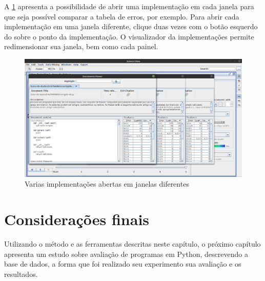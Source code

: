 		A \cref{fig:ladoAlado} apresenta a possibilidade de abrir uma implementação em
		cada janela para que seja possível comparar a tabela de erros, por exemplo.
		Para abrir cada implementação em uma janela diferente, clique duas vezes com
		o botão esquerdo do  sobre o ponto da implementação. O
		visualizador da implementações permite redimensionar sua janela, bem como
		cada painel.
		
		\begin{figure}
			\centering
			\includegraphics[width=0.7\linewidth]{imagem/ladoAlado}
			\caption{Varias implementações abertas em janelas diferentes}
			\label{fig:ladoAlado}
		\end{figure}
		

	\section{Considerações finais}
	
		Utilizando o método e as ferramentas descritas neste capítulo,
		o próximo capítulo apresenta um estudo sobre avaliação de programas em Python,
		descrevendo a base de dados, a forma que foi realizado
		seu experimento sua avaliação e os resultados.